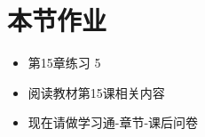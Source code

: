 \documentclass[17pt]{beamer}
\begin{document}
\section{本节作业}

\begin{frame}{\insertsection }
  \begin{itemize}
    \item
      第15章练习 5
    \item
      阅读教材第15课相关内容
    \bigskip
    \item
      现在请做学习通\nobreakdash-章节\nobreakdash-课后问卷
  \end{itemize}
\end{frame}
\end{document}
